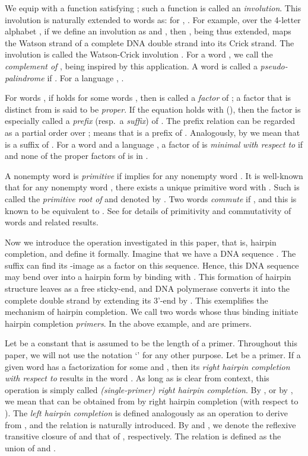 \documentclass{article}
\theoremstyle{plain}
\theoremstyle{remark}
\begin{document}
We equip  with a function  satisfying ; such a function is called an {\it involution}. 
This involution  is naturally extended to words as: for , . 
For example, over the 4-letter alphabet , if we define an involution  as  and , then , being thus extended, maps the Watson strand of a complete DNA double strand into its Crick strand. 
The involution  is called the Watson-Crick involution \cite{KariMahalingam08}. 
For a word , we call  the {\it complement of }, being inspired by this application. 
A word  is called a {\it pseudo-palindrome} if . 
For a language , . 

For words , if  holds for some words , then  is called a {\it factor} of ; a factor that is distinct from  is said to be {\it proper}. 
If the equation holds with  (), then the factor  is especially called a {\it prefix} (resp.~a {\it suffix}) of . 
The prefix relation can be regarded as a partial order  over ;  means that  is a prefix of . 
Analogously, by  we mean that  is a suffix of . 
For a word  and a language , a factor  of  is {\it minimal with respect to } if  and none of the proper factors of  is in . 

A nonempty word  is {\it primitive} if  implies  for any nonempty word . 
It is well-known that for any nonempty word , there exists a unique primitive word  with . 
Such  is called the {\it primitive root of } and denoted by . 
Two words  {\it commute} if , and this is known to be equivalent to . 
See \cite{ChKa97} for details of primitivity and commutativity of words and related results. 

Now we introduce the operation investigated in this paper, that is, hairpin completion, and define it formally. 
Imagine that we have a DNA sequence . 
The suffix  can find its -image as a factor  on this sequence. 
Hence, this DNA sequence may bend over into a hairpin form by  binding with . 
This formation of hairpin structure leaves  as a free sticky-end, and DNA polymerase converts it into the complete double strand by extending its 3'-end by . 
This exemplifies the mechanism of hairpin completion. 
We call two words whose thus binding initiate hairpin completion {\it primers}. 
In the above example,  and  are primers. 

Let  be a constant that is assumed to be the length of a primer. 
Throughout this paper, we will not use the notation `' for any other purpose. 
Let  be a primer. 
If a given word  has a factorization  for some  and , then its {\it right hairpin completion with respect to } results in the word . 
As long as  is clear from context, this operation is simply called {\it (single-primer) right hairpin completion}. 
By , or by , we mean that  can be obtained from  by right hairpin completion (with respect to ). 
The {\it left hairpin completion} is defined analogously as an operation to derive  from , and the relation  is naturally introduced. 
By  and , we denote the reflexive transitive closure of  and that of , respectively. 
The relation  is defined as the union of  and . 
\end{document}
